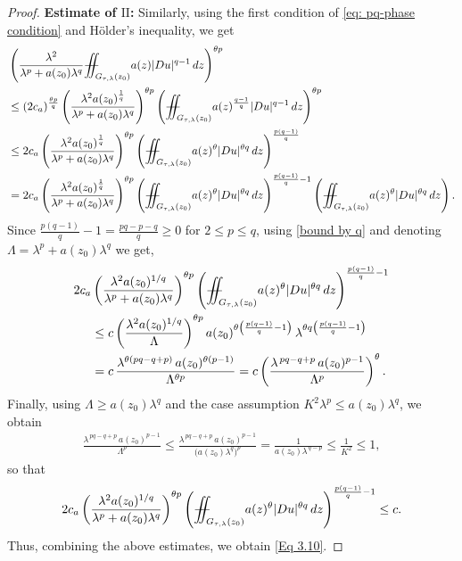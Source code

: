 \documentclass[notitlepage,11pt,reqno]{amsart}
\theoremstyle{definition}
\numberwithin{equation}{section}
\newcommand{\iintss}{{\int\hspace{-0.28cm}\int}}
\newcommand{ \miints }{{\iintss\hspace{-0.56cm} -\hspace{-0.15cm}-}}
\newcommand{\miint}[1]{{\miints_{\hspace{-0.13cm}#1}}}
\begin{document}
\begin{proof}
\noindent\textbf{Estimate of $\mathrm{II}$:} Similarly, using the first condition of \eqref{eq: pq-phase condition} and H\"{o}lder's inequality, we get
\begin{align*}
&\left(\frac{\lambda^2}{\lambda^p+a(z_0)\lambda^q}\miint{G_{\tau, \lambda}(z_0)}a(z)|Du|^{q-1}\,dz\right)^{\theta p}\\
&\leq (2c_a)^{\frac{\theta p}{q}}\left(\frac{\lambda^2 a(z_0)^{\frac{1}{q}}}{\lambda^p+a(z_0)\lambda^q}\right)^{\theta p}\left(\miint{G_{\tau, \lambda}(z_0)}a(z)^{\frac{q-1}{q}}|Du|^{q-1}\, dz\right)^{\theta p}\\
&\leq 2c_a \left(\frac{\lambda^2 a(z_0)^{\frac{1}{q}}}{\lambda^p+a(z_0)\lambda^q}\right)^{\theta p} \left(\miint{G_{\tau, \lambda}(z_0)}a(z)^{\theta}|Du|^{\theta q}\, dz\right)^{\frac{p(q-1)}{q}}\\
&=2c_a \left(\frac{\lambda^2 a(z_0)^{\frac{1}{q}}}{\lambda^p+a(z_0)\lambda^q}\right)^{\theta p} \left(\miint{G_{\tau, \lambda}(z_0)}a(z)^{\theta}|Du|^{\theta q}\, dz\right)^{\frac{p(q-1)}{q}-1}\left(\miint{G_{\tau, \lambda}(z_0)}a(z)^{\theta}|Du|^{\theta q}\, dz\right).
\end{align*}
Since $\frac{p(q-1)}{q}-1=\frac{pq-p-q}{q}\geq 0$ for $2\leq p\leq q$, using \eqref{bound by q} and denoting $\Lambda=\lambda^p+a(z_0)\lambda^q$ we get,
\begin{align*}
    2c_a&\left(\frac{\lambda^{2}a(z_0)^{1/q}}{\lambda^{p}+a(z_0)\lambda^{q}}\right)^{\theta p}
    \left(\miint{G_{\tau,\lambda}(z_0)} a(z)^{\theta}|Du|^{\theta q}\,dz\right)^{\frac{p(q-1)}{q}-1}
    \notag\\
    &\leq c\left(\frac{\lambda^{2}a(z_0)^{1/q}}{\Lambda}\right)^{\theta p}
        a(z_0)^{\theta\left(\frac{p(q-1)}{q}-1\right)}\,
        \lambda^{\theta q\left(\frac{p(q-1)}{q}-1\right)}
    \notag\\
    &= c\,\frac{\lambda^{\theta(pq-q+p)}\,a(z_0)^{\theta(p-1)}}{\Lambda^{\theta p}}
    = c\left(\frac{\lambda^{\,pq-q+p}\,a(z_0)^{p-1}}{\Lambda^{p}}\right)^{\theta}.
\end{align*}
Finally, using $\Lambda\geq a(z_0)\lambda^{q}$ and the case assumption $K^{2}\lambda^{p}\leq a(z_0)\lambda^{q}$, we obtain
\begin{align*}
    \frac{\lambda^{\,pq-q+p}\,a(z_0)^{p-1}}{\Lambda^{p}}
    \leq \frac{\lambda^{\,pq-q+p}\,a(z_0)^{p-1}}{\bigl(a(z_0)\lambda^{q}\bigr)^{p}}
    = \frac{1}{a(z_0)\lambda^{\,q-p}}
    \leq \frac{1}{K^{2}}\leq 1,
\end{align*}
so that
\begin{align*}
    2c_a\left(\frac{\lambda^{2}a(z_0)^{1/q}}{\lambda^{p}+a(z_0)\lambda^{q}}\right)^{\theta p}
    \left(\miint{G_{\tau,\lambda}(z_0)} a(z)^{\theta}|Du|^{\theta q}\,dz\right)^{\frac{p(q-1)}{q}-1}
    \leq c.
\end{align*}
Thus, combining the above estimates, we obtain \eqref{Eq 3.10}.


\end{proof}
\end{document}
